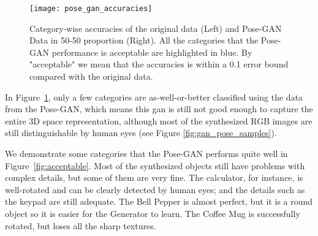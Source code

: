 \begin{figure}[h!]
	\centering
	\texttt{[image: pose\_gan\_accuracies]}
	\caption{Category-wise accuracies of the original data (Left) and Pose-GAN Data in
		50-50 proportion (Right). All the categories that the Pose-GAN performance is
		acceptable are highlighted in blue. By "acceptable" we mean that the accuracies is within
	a 0.1 error bound compared with the original data.}
	\label{fig:pose_gan_accuracies}
\end{figure}

In Figure~\ref{fig:pose_gan_accuracies}, only a few categories are
as-well-or-better classified using the data from the Pose-GAN, which means this
\acrshort{gan} is still not good enough to capture the entire 3D space representation,
although most of the synthesized RGB images are still distinguishable by human eyes (see
Figure \ref{fig:gan_pose_samples}).

We demonstrate some categories that the Pose-GAN performs quite well in
Figure~\ref{fig:acceptable}. Most of the synthesized objects still have problems with
complex details, but some of them are very fine. The calculator, for instance, is
well-rotated and can be clearly detected by human eyes; and the details such as the keypad
are still adequate. The Bell Pepper is almost perfect, but it is a round object so it is
easier for the Generator to learn. The Coffee Mug is successfully rotated, but loses all
the sharp textures.

